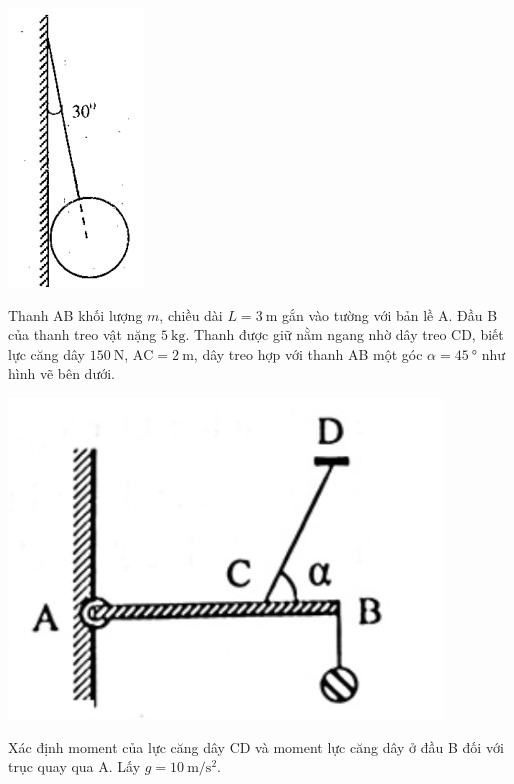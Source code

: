 \begin{ex}
	{\vspace{-0.75cm}\includegraphics[scale=0.8]{../figs/D10-KTTX3-BOSUNG-4}}
\end{ex}
\begin{ex}
	Thanh AB khối lượng $m$, chiều dài $L=\SI{3}{\meter}$ gắn vào tường với bản lề A. Đầu B của thanh treo vật nặng $\SI{5}{\kilogram}$. Thanh được giữ nằm ngang nhờ dây treo CD, biết lực căng dây $\SI{150}{\newton}$, $\mathrm{AC}=\SI{2}{\meter}$, dây treo hợp với thanh AB một góc $\alpha=\SI{45}{\degree}$ như hình vẽ bên dưới. 
	\begin{center}
		\includegraphics[width=0.25\linewidth]{../figs/VN10-2022-PH-TP023-P-11}
	\end{center}
	Xác định moment của lực căng dây CD và moment lực căng dây ở đầu B đối với trục quay qua A. Lấy $g=\SI{10}{\meter/\second^2}$.	
\end{ex}
